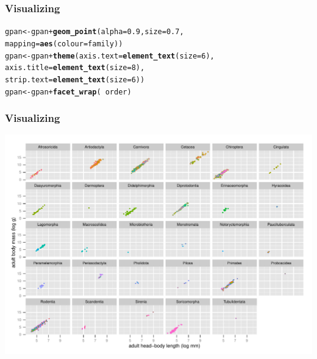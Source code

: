 \documentclass{beamer}\usepackage{graphicx, color}
\makeatletter
\def\maxwidth{ %
  \ifdim\Gin@nat@width>\linewidth
    \linewidth
  \else
    \Gin@nat@width
  \fi
}
\newcommand{\hlfunctioncall}[1]{\textcolor[rgb]{0.501960784313725,0,0.329411764705882}{\textbf{#1}}}%
\newenvironment{kframe}{%
 \def\at@end@of@kframe{}%
 \ifinner\ifhmode%
  \def\at@end@of@kframe{\end{minipage}}%
  \begin{minipage}{\columnwidth}%
 \fi\fi%
 \def\FrameCommand##1{\hskip\@totalleftmargin \hskip-\fboxsep
 \colorbox{shadecolor}{##1}\hskip-\fboxsep
     \hskip-\linewidth \hskip-\@totalleftmargin \hskip\columnwidth}%
 \MakeFramed {\advance\hsize-\width
   \@totalleftmargin\z@ \linewidth\hsize
   \@setminipage}}%
 {\par\unskip\endMakeFramed%
 \at@end@of@kframe}
\newenvironment{knitrout}{}{} %
\makeatother
\begin{document}
\begin{frame}[fragile]
  \frametitle{Visualizing}
\begin{knitrout}\scriptsize
{}\color{fgcolor}\begin{kframe}
\begin{alltt}
gpan <- gpan + \hlfunctioncall{geom_point}(alpha = 0.9, size = 0.7,
                          mapping = \hlfunctioncall{aes}(colour = family))
gpan <- gpan + \hlfunctioncall{theme}(axis.text = \hlfunctioncall{element_text}(size = 6),
                     axis.title = \hlfunctioncall{element_text}(size = 8),
                     strip.text = \hlfunctioncall{element_text}(size = 6))
gpan <- gpan + \hlfunctioncall{facet_wrap}(~ order)
\end{alltt}
\end{kframe}
\end{knitrout}

\end{frame}

\begin{frame}[fragile]
  \frametitle{Visualizing}
\begin{knitrout}\scriptsize
{}\color{fgcolor}
\includegraphics[width=\maxwidth]{figure/unnamed-chunk-23} 

\end{knitrout}

\end{frame}
\end{document}
